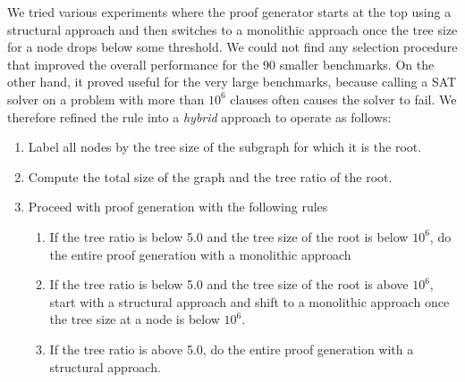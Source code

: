 \documentclass[twoside,11pt]{article}
\begin{document}
We tried various experiments where the proof generator starts at the
top using a structural approach and then switches to a monolithic
approach once the tree size for a node drops below some threshold.  We
could not find any selection procedure that improved the overall
performance for the 90 smaller benchmarks.  On the other hand, it
proved useful for the very large benchmarks, because calling a SAT
solver on a problem with more than $10^6$ clauses often causes the
solver to fail.  We therefore refined the rule into a \emph{hybrid} approach to operate as follows:
\begin{enumerate}
\item Label all nodes by the tree size of the subgraph for which it is the root.
\item Compute the total size of the graph and the tree ratio of the root.
\item Proceed with proof generation with the following rules
  \begin{enumerate}
  \item If the tree ratio is below 5.0 and the tree size of the root is below $10^6$, do the entire proof generation with a monolithic approach
  \item If the tree ratio is below 5.0 and the tree size of the root is above $10^6$, start with a structural approach and shift to a monolithic approach once the tree size at a node is below $10^6$.
  \item If the tree ratio is above 5.0, do the entire proof generation
    with a structural approach.
  \end{enumerate}
\end{enumerate}
\end{document}
